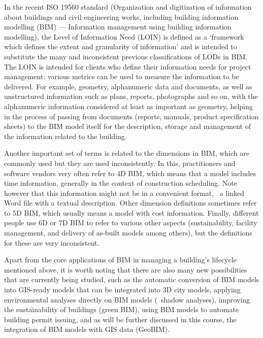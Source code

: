 In the recent ISO 19560 standard (Organization and digitization of information about buildings and civil engineering works, including building information modelling (BIM) --- Information management using building information modelling), the Level of Information Need (LOIN) is defined as a `framework which defines the extent and granularity of information' and is intended to substitute the many and inconsistent previous classifications of LODs in BIM\@.
The LOIN is intended for clients who define their information needs for project management: various metrics can be used to measure the information to be delivered.
For example, geometry, alphanumeric data and documents, as well as unstructured information such as plans, reports, photographs and so on, with the alphanumeric information considered at least as important as geometry, helping in the process of passing from documents (reports, manuals, product specification sheets) to the BIM model itself for the description, storage and management of the information related to the building.

Another important set of terms is related to the dimensions in BIM, which are commonly used but they are used inconsistently\@.
In this, practitioners and software vendors very often refer to 4D BIM, which means that a model includes time information, generally in the context of construction scheduling.
Note however that this information might not be in a convenient format, \eg\ a linked Word file with a textual description.
Other dimension definitions sometimes refer to 5D BIM, which usually means a model with cost information.
Finally, different people use 6D or 7D BIM to refer to various other aspects (sustainability, facility management, and delivery of as-built models among others), but the definitions for these are very inconsistent.

Apart from the core applications of BIM in managing a building's lifecycle mentioned above, it is worth noting that there are also many new possibilities that are currently being studied, such as the automatic conversion of BIM models into GIS-ready models that can be integrated into 3D city models, applying environmental analyses directly on BIM models (\eg\ shadow analyses), improving the sustainability of buildings (green BIM), using BIM models to automate building permit issuing, and as will be further discussed in this course, the integration of BIM models with GIS data (GeoBIM).

